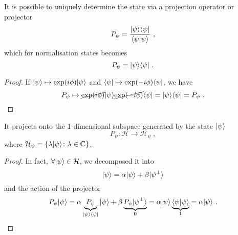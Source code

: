     It is possible to uniquely determine the state via a projection operator or projector 
    \begin{equation*}
        P_\psi = \frac{\vert\psi\rangle \langle\psi\vert}{\langle\psi\vert\psi\rangle} ~,
    \end{equation*}
    which for normalisation states becomes 
    \begin{equation*}
        P_\psi = \vert\psi\rangle \langle\psi\vert ~.
    \end{equation*}
    \begin{proof}
        If $\vert\psi\rangle \mapsto \exp(i \phi) \vert\psi\rangle$ and $\langle\psi\vert \mapsto \exp(- i \phi) \langle\psi\vert$, we have 
        \begin{equation*}
            P_\psi \mapsto \cancel{\exp(i \phi)} \vert\psi\rangle \cancel{\exp(- i \phi)} \langle\psi\vert = \vert\psi\rangle \langle\psi\vert = P_\psi ~.
        \end{equation*}
    \end{proof}
    It projects onto the $1$-dimensional subspace generated by the state $\vert\psi\rangle$
    \begin{equation*}
        P_\psi \colon \mathcal H \rightarrow \mathcal H_\psi ~,
    \end{equation*}
    where $\mathcal H_\psi = \{\lambda \vert\psi\rangle \colon \lambda \in \mathbb C\}$.
    \begin{proof}
        In fact, $\forall \vert\psi\rangle \in \mathcal H$, we decomposed it into 
        \begin{equation*}
            \vert\psi\rangle = \alpha \vert\psi\rangle + \beta \vert\psi^\perp\rangle
        \end{equation*}
        and the action of the projector
        \begin{equation*}
            P_\psi \vert\psi\rangle = \alpha \underbrace{P_\psi}_{\vert\psi\rangle \langle\psi\vert} \vert\psi\rangle + \beta \underbrace{P_\psi \vert\psi^\perp\rangle}_0 = \alpha \vert\psi\rangle \underbrace{\langle\psi\vert\psi\rangle}_1 = \alpha \vert\psi\rangle ~.
        \end{equation*}
    \end{proof}

